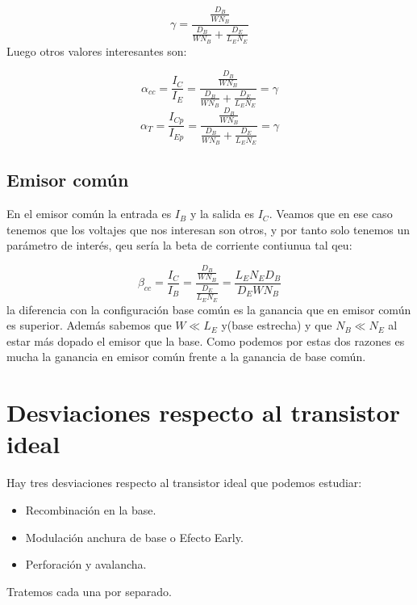 \begin{equation*}
    \gamma = \frac{\frac{D_B}{WN_B}}{\frac{D_B}{WN_B}+\frac{D_E}{L_EN_E}}
\end{equation*}
Luego otros valores interesantes son: 

\begin{equation}
    \alpha_{cc} = \frac{I_C}{I_E} = \frac{\frac{D_B}{WN_B}}{\frac{D_B}{WN_B}+\frac{D_E}{L_EN_E}} = \gamma 
\end{equation}
\begin{equation}
    \alpha_T = \frac{I_{Cp}}{I_{Ep}}  = \frac{\frac{D_B}{WN_B}}{\frac{D_B}{WN_B}+\frac{D_E}{L_EN_E}} = \gamma 
\end{equation}

\subsection{Emisor común}

En el emisor común la entrada es $I_B$ y la salida es $I_C$. Veamos que en ese caso tenemos que los voltajes que nos interesan son otros, y por tanto solo tenemos un parámetro de interés, qeu sería la beta de corriente contiunua tal qeu:

\begin{equation*}
    \beta_{cc} = \frac{I_C}{I_B} = \frac{\frac{D_B}{WN_B}}{ \frac{D_E}{L_EN_E}} = \frac{L_E N_E D_B}{D_E W N_B } 
\end{equation*}
la diferencia con la configuración base común es la ganancia que en emisor común es superior. Además sabemos que $W\ll L_E$ y(base estrecha) y que $N_B\ll N_E$ al estar más dopado el emisor que la base. Como podemos por estas dos razones es mucha la ganancia en emisor común frente a la ganancia de base común. 



\section{Desviaciones respecto al transistor ideal}

Hay tres desviaciones respecto al transistor ideal que podemos estudiar: 

\begin{itemize}
    \item Recombinación en la base.
    \item Modulación anchura de base o Efecto Early.
    \item Perforación y avalancha. 
\end{itemize}
Tratemos cada una por separado. 

